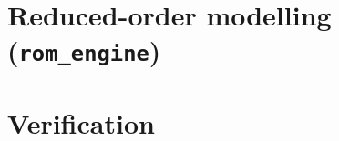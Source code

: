 \documentclass[11pt,a4paper,twoside,openany]{book}
\begin{document}
\part{Reduced-order modelling (\texttt{rom\_engine})}






\part{Verification}


\appendix





\backmatter
\end{document}
